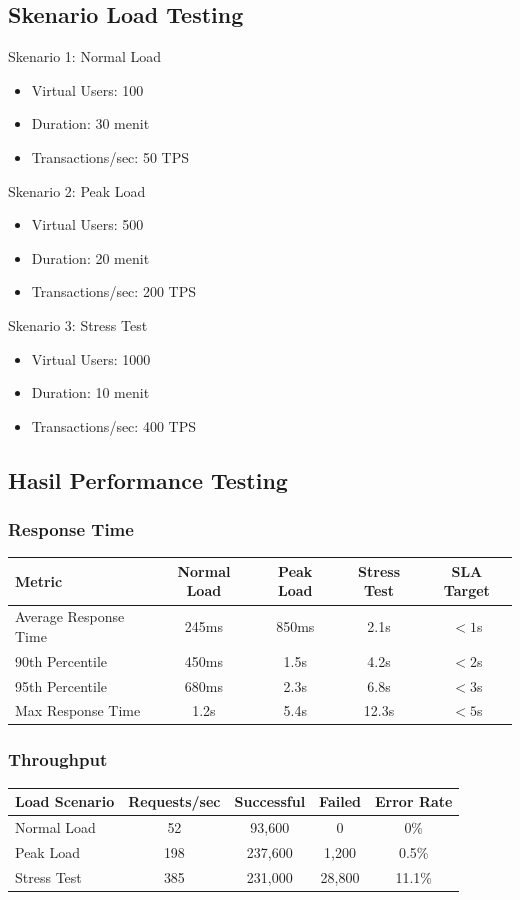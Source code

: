 \documentclass[12pt,a4paper]{article}
\begin{document}
\subsection{Skenario Load Testing}
Skenario 1: Normal Load
\begin{itemize}
  \item Virtual Users: 100
  \item Duration: 30 menit
  \item Transactions/sec: 50 TPS
\end{itemize}
Skenario 2: Peak Load
\begin{itemize}
  \item Virtual Users: 500
  \item Duration: 20 menit
  \item Transactions/sec: 200 TPS
\end{itemize}
Skenario 3: Stress Test
\begin{itemize}
  \item Virtual Users: 1000
  \item Duration: 10 menit
  \item Transactions/sec: 400 TPS
\end{itemize}

\subsection{Hasil Performance Testing}
\subsubsection{Response Time}
\begin{tabularx}{\textwidth}{@{}lcccc@{}}
\toprule
Metric & Normal Load & Peak Load & Stress Test & SLA Target \\
\midrule
Average Response Time & 245ms & 850ms & 2.1s & $<1$s \\
90th Percentile & 450ms & 1.5s & 4.2s & $<2$s \\
95th Percentile & 680ms & 2.3s & 6.8s & $<3$s \\
Max Response Time & 1.2s & 5.4s & 12.3s & $<5$s \\
\bottomrule
\end{tabularx}

\subsubsection{Throughput}
\begin{tabularx}{\textwidth}{@{}lcccc@{}}
\toprule
Load Scenario & Requests/sec & Successful & Failed & Error Rate \\
\midrule
Normal Load & 52 & 93{,}600 & 0 & 0\% \\
Peak Load & 198 & 237{,}600 & 1{,}200 & 0.5\% \\
Stress Test & 385 & 231{,}000 & 28{,}800 & 11.1\% \\
\bottomrule
\end{tabularx}
\end{document}

